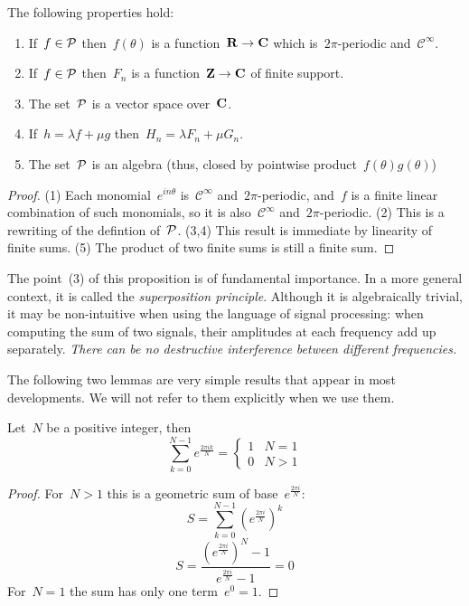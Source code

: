 \begin{proposition}\label{prp:elementary}
The following properties hold:
\begin{enumerate}
	\item If~$f\in\mathcal{P}$ then~$f(\theta)$ is a
		function~$\mathbf{R}\to\mathbf{C}$ which is~$2\pi$-periodic
		and~$\mathcal{C}^\infty$.
	\item If~$f\in\mathcal{P}$ then~$F_n$ is a function~$\mathbf{Z}\to\mathbf{C}$ of finite
		support.
	\item The set~$\mathcal{P}$ is a vector space over~$\mathbf{C}$.
	\item If~$h=\lambda f+\mu g$ then~$H_n=\lambda F_n+\mu G_n$.
	\item The set~$\mathcal{P}$ is an algebra (thus, closed by
		pointwise product~$f(\theta)g(\theta)$)
\end{enumerate}
\end{proposition}

\begin{proof}
(1) Each monomial~$e^{in\theta}$ is~$\mathcal{C}^\infty$
	and~$2\pi$-periodic, and~$f$ is a finite linear
	combination of such monomials, so it is
	also~$\mathcal{C}^\infty$ and~$2\pi$-periodic.
(2) This is a rewriting of the defintion of~$\mathcal{P}$.
(3,4) This result is immediate by linearity of finite sums.
(5) The product of two finite sums is still a finite sum.
\end{proof}

The point~(3) of this proposition is of fundamental importance.  In a more
general context, it is called the \emph{superposition principle}.  Although it
is algebraically trivial, it may be non-intuitive when using the language of
signal processing: when computing the sum of two signals, their amplitudes at
each frequency add up separately. \emph{There can be no destructive
interference between different frequencies.}

The following two lemmas are very simple results that appear in most
developments.  We will not refer to them explicitly when we use them.

\begin{lemma}
	Let~$N$ be a positive integer, then
	$$
	\sum_{k=0}^{N-1} e^\frac{2\pi ik}{N} =
	\begin{cases}
		1 & N=1 \\
		0 & N>1
	\end{cases}
	$$
\end{lemma}

\begin{proof}
	For~$N>1$ this is
	a geometric sum of base~$e^\frac{2\pi i}{N}$:
	$$S=\sum_{k=0}^{N-1}\left(e^\frac{2\pi i}{N}\right)^k$$
	$$S =\frac{\left(e^\frac{2\pi i}{N}\right)^N - 1}{e^\frac{2\pi i}{N}-1}=0$$
	For~$N=1$ the sum has only one term~$e^0=1$.
\end{proof}

